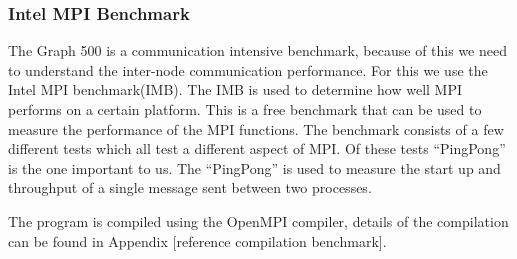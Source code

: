 \subsubsection{Intel MPI Benchmark}
\label{tools-imb}
The Graph 500 is a communication intensive benchmark, because of this we need to understand the inter-node communication performance. For this we use the Intel MPI benchmark(IMB).  
The IMB is used to determine how well MPI performs on a certain platform. This is a free benchmark that can be used to measure  the performance of the MPI functions. The benchmark consists of a few different tests which all test a different aspect of MPI. Of these tests ``PingPong'' is the one important to us. The ``PingPong'' is used to measure the start up and throughput of a single message sent between two processes\cite{img-userguide}.

 The program is compiled using the OpenMPI compiler, details of the compilation can be found in Appendix [reference compilation benchmark].

